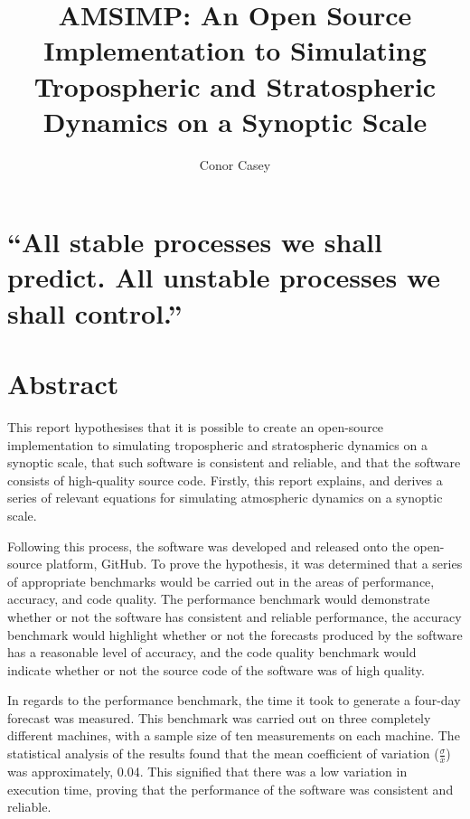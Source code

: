 \documentclass[12pt]{style}
\title{AMSIMP: An Open Source Implementation to Simulating Tropospheric and Stratospheric Dynamics on a Synoptic Scale}
\author{Conor Casey}
\begin{document}
\maketitle

\clearpage\mbox{}\clearpage


\chapter*{
\centering
    ``All stable processes we shall predict. All unstable processes we shall control.”
\\[5pt]
}

\chapter*{Abstract}
This report hypothesises that it is possible to create an open-source implementation to simulating tropospheric and stratospheric dynamics on a synoptic scale, that such software is consistent and reliable, and that the software consists of high-quality source code. Firstly, this report explains, and derives a series of relevant equations for simulating atmospheric dynamics on a synoptic scale.

Following this process, the software was developed and released onto the open-source platform, GitHub. To prove the hypothesis, it was determined that a series of appropriate benchmarks would be carried out in the areas of performance, accuracy, and code quality. The performance benchmark would demonstrate whether or not the software has consistent and reliable performance, the accuracy benchmark would highlight whether or not the forecasts produced by the software has a reasonable level of accuracy, and the code quality benchmark would indicate whether or not the source code of the software was of high quality.

In regards to the performance benchmark, the time it took to generate a four-day forecast was measured. This benchmark was carried out on three completely different machines, with a sample size of ten measurements on each machine. The statistical analysis of the results found that the mean coefficient of variation ($\frac{\sigma}{\bar{x}}$) was approximately, 0.04. This signified that there was a low variation in execution time, proving that the performance of the software was consistent and reliable.
\end{document}
